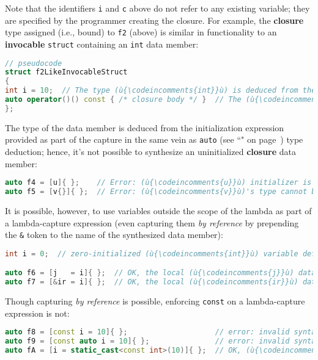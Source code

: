 \noindent Note that the identifiers \texttt{i} and \texttt{c} above do not refer
to any existing variable; they are specified by the programmer creating
the closure. For example, the \textbf{closure} type assigned (i.e.,
bound) to \texttt{f2} (above) is similar in functionality to an
\textbf{invocable} \texttt{struct} containing an \texttt{int} data
member:

\begin{lstlisting}[language=C++]
// pseudocode
struct f2LikeInvocableStruct
{
int i = 10;  // The type (ù{\codeincomments{int}}ù) is deduced from the initialization expression.
auto operator()() const { /* closure body */ }  // The (ù{\codeincomments{struct}}ù) is invocable.
};
\end{lstlisting}

\noindent The type of the data member is deduced from the initialization
expression provided as part of the capture in the same vein as
\texttt{auto} (see ``" on page~\pageref{auto-feature}) type deduction; hence, it's not possible to
synthesize an uninitialized \textbf{closure} data member:

\begin{lstlisting}[language=C++]
auto f4 = [u]{ };    // Error: (ù{\codeincomments{u}}ù) initializer is missing for lambda capture.
auto f5 = [v{}]{ };  // Error: (ù{\codeincomments{v}}ù)'s type cannot be deduced.
\end{lstlisting}

\noindent It is possible, however, to use variables outside the scope of the
lambda as part of a lambda-capture expression (even capturing them \textit{by
reference} by prepending the \texttt{\&} token to the name of the
synthesized data member):

\begin{lstlisting}[language=C++]
int i = 0;  // zero-initialized (ù{\codeincomments{int}}ù) variable defined in the enclosing scope

auto f6 = [j   = i]{ };  // OK, the local (ù{\codeincomments{j}}ù) data member is a copy of (ù{\codeincomments{i}}ù).
auto f7 = [&ir = i]{ };  // OK, the local (ù{\codeincomments{ir}}ù) data member is an alias to (ù{\codeincomments{i}}ù).
\end{lstlisting}

\noindent Though capturing \textit{by reference} is possible, enforcing \texttt{const} on a lambda-capture expression is not:

\begin{lstlisting}[language=C++]
auto f8 = [const i = 10]{ };                    // error: invalid syntax
auto f9 = [const auto i = 10]{ };               // error: invalid syntax
auto fA = [i = static_cast<const int>(10)]{ };  // OK, (ù{\codeincomments{const}}ù) is ignored.
\end{lstlisting}

